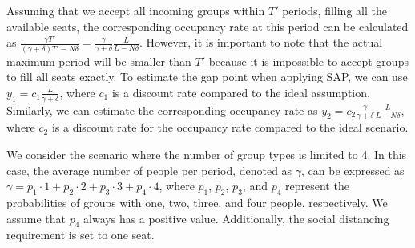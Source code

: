 
Assuming that we accept all incoming groups within $T'$ periods, filling all the available seats, the corresponding occupancy rate at this period can be calculated as $\frac{\gamma T'}{(\gamma+ \delta)T' - N \delta} = \frac{\gamma}{\gamma +\delta} \frac{L}{L-N \delta}$. However, it is important to note that the actual maximum period will be smaller than $T{'}$ because it is impossible to accept groups to fill all seats exactly. To estimate the gap point when applying SAP, we can use $y_1 = c_1 \frac{L}{\gamma + \delta}$, where $c_1$ is a discount rate compared to the ideal assumption. Similarly, we can estimate the corresponding occupancy rate as $y_2 = c_2 \frac{\gamma}{\gamma +\delta} \frac{L}{L-N \delta}$, where $c_2$ is a discount rate for the occupancy rate compared to the ideal scenario.




We consider the scenario where the number of group types is limited to 4. In this case, the average number of people per period, denoted as $\gamma$, can be expressed as $\gamma = p_1 \cdot 1 + p_2 \cdot 2 + p_3 \cdot 3 + p_4 \cdot 4$, where $p_1$, $p_2$, $p_3$, and $p_4$ represent the probabilities of groups with one, two, three, and four people, respectively. We assume that $p_4$ always has a positive value. Additionally, the social distancing requirement is set to one seat.

